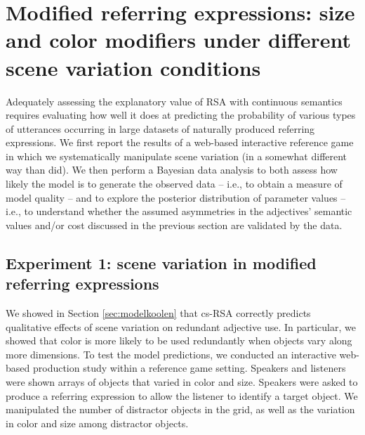 \documentclass[11pt]{article}
\newcommand{\appref}[1]{Appendix \ref{#1}}
\newcommand{\sectionref}[1]{Section \ref{#1}}
\begin{document}
\section[]{Modified referring expressions: size and color modifiers under different scene variation conditions}
\label{sec:rsaevaluationbasicscene}

Adequately assessing the explanatory value of RSA with continuous semantics requires evaluating how well it does at predicting the probability of various types of utterances occurring in large datasets of naturally produced referring expressions. We first report the results of a web-based interactive reference game in which we systematically manipulate scene variation (in a somewhat different way than  did). 
We then perform a Bayesian data analysis to both assess  how likely the model is to generate the observed data -- i.e., to obtain a measure of model quality -- and to explore the posterior distribution of parameter values -- i.e., to understand whether the assumed asymmetries in the adjectives' semantic values and/or cost discussed in the previous section are validated by the data.


\subsection{Experiment 1: scene variation in modified referring expressions}
\label{sec:exp1-scenevar}

We showed in \sectionref{sec:modelkoolen} that cs-RSA correctly predicts qualitative effects of scene variation on redundant adjective use. In particular, we showed that color is more likely to be used redundantly when objects vary along more dimensions. 
To test the model predictions, we conducted an interactive web-based production study within a reference game setting. %
Speakers and listeners were shown arrays of objects that varied in color and size. Speakers were asked to produce a referring expression to allow the listener to identify a target object. We manipulated the number of distractor objects in the grid, as well as the variation in color and size among distractor objects.
\end{document}
